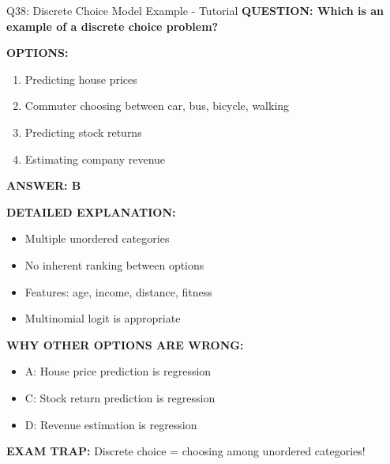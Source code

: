 \documentclass[8pt]{beamer}
\begin{document}
	\begin{frame}{Q38: Discrete Choice Model Example - Tutorial}
		\fontsize{6.5}{7.5}\selectfont
		\textbf{QUESTION: Which is an example of a discrete choice problem?}
		
		\vspace{0.1cm}
		\textbf{OPTIONS:}
		\begin{enumerate}
			\item Predicting house prices
			\item Commuter choosing between car, bus, bicycle, walking
			\item Predicting stock returns
			\item Estimating company revenue
		\end{enumerate}
		
		\vspace{0.1cm}
		\textcolor{myblue}{\textbf{ANSWER: B}}
		
		\vspace{0.1cm}
		\textbf{DETAILED EXPLANATION:}
		\begin{itemize}
			\item Multiple unordered categories
			\item No inherent ranking between options
			\item Features: age, income, distance, fitness
			\item Multinomial logit is appropriate
		\end{itemize}
		
		\vspace{0.1cm}
		\textcolor{myred}{\textbf{WHY OTHER OPTIONS ARE WRONG:}}
		\begin{itemize}
			\item \textcolor{myred}{A:} House price prediction is regression
			\item \textcolor{myred}{C:} Stock return prediction is regression
			\item \textcolor{myred}{D:} Revenue estimation is regression
		\end{itemize}
		
		\textcolor{myred}{\textbf{EXAM TRAP:}} Discrete choice = \textcolor{myblue}{choosing among unordered categories}!
	\end{frame}
	
\end{document}
